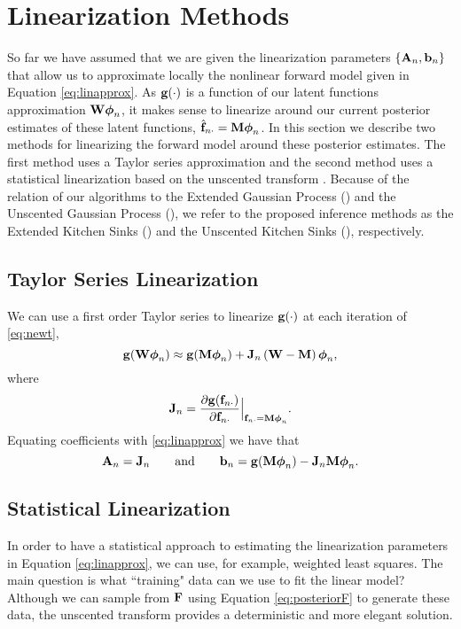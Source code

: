\section{Linearization Methods}
So far we have assumed that we are given the linearization parameters $\{\mathbf{A}_n, \mathbf{b}_n\}$ that allow us to 
approximate locally the nonlinear forward model given in Equation   \eqref{eq:linapprox}. As 
$\mathbf{g}\!\left({{\cdot}}\right)$  is a function of our latent functions approximation ${\mathbf{W} \boldsymbol\phi_n}$,  
it makes sense to linearize around our current posterior estimates of these latent functions, 
$\hat{\mathbf{f}}_{n \cdot} =\mathbf{M} \boldsymbol\phi_n$. In this section we describe two methods for linearizing 
the  forward model around these posterior estimates. The first method uses a Taylor series approximation and the second 
method uses a statistical linearization \citep{Geist2010} based on the unscented transform \citep{Julier2004}. 
Because of the relation of our algorithms to the Extended Gaussian Process (\egp) and 
the  Unscented Gaussian Process (\ugp),   we refer to 
the proposed inference methods as  the Extended Kitchen Sinks (\eks) and the 
Unscented Kitchen Sinks (\uks), respectively.
%
\subsection{Taylor Series Linearization}
\label{sub:taylor}
We can use a first order Taylor series to linearize $\mathbf{g}\!\left({{\cdot}}\right)$ at each
iteration of \eqref{eq:newt},
\begin{equation}
    \mathbf{g}\!\left({{\mathbf{W}\boldsymbol\phi_n}}\right) \approx \mathbf{g}\!\left({{\mathbf{M}\boldsymbol\phi_n}}\right) +
    \mathbf{J}_{n}\left({\mathbf{W} - \mathbf{M}}\right)\boldsymbol\phi_n,
\end{equation}
where 
\begin{equation}
\mathbf{J}_{n} = \frac{ \partial\mathbf{g}\!\left({{\mathbf{f}_{n \cdot}}}\right) } {  \partial \mathbf{f}_{n \cdot} }  \Big|_{\mathbf{f}_{n \cdot} = \mathbf{M} \boldsymbol\phi_n } \text{.}
\end{equation}
Equating coefficients with \eqref{eq:linapprox} we have that
\begin{equation}
    \mathbf{A}_n = \mathbf{J}_{n} \qquad \text{and} \qquad \mathbf{b}_n = 
        \mathbf{g}\!\left({{\mathbf{M}\boldsymbol\phi_n}}\right) - \mathbf{J}_{n}\mathbf{M}\boldsymbol\phi_n.
\end{equation}
%
\subsection{Statistical Linearization}
In order to have a  statistical approach to estimating the linearization parameters 
 in  Equation \eqref{eq:linapprox}, we can  use, for example, weighted least squares.  The main question 
is what ``training" data  can we use to fit the linear model? Although we can 
sample from $\mathbf{F}$ using Equation \eqref{eq:posteriorF} to generate these data, 
the unscented transform  \citep[\ut;][]{Julier2004} provides a deterministic and more elegant solution. 

